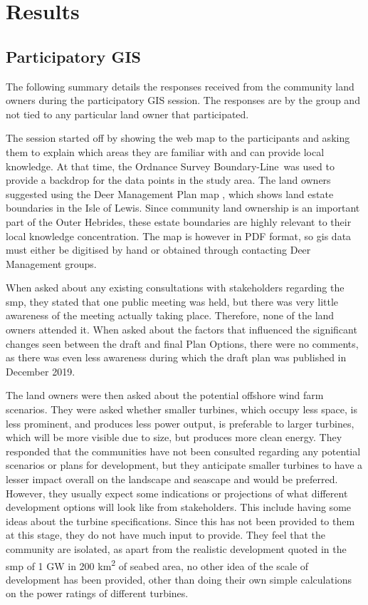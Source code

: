 \chapter{Results}

\section{Participatory GIS}

The following summary details the responses received from the community land owners during the participatory GIS session. The responses are by the group and not tied to any particular land owner that participated.

The session started off by showing the web map to the participants and asking them to explain which areas they are familiar with and can provide local knowledge. At that time, the Ordnance Survey Boundary-Line\texttrademark\ was used to provide a backdrop for the data points in the study area. The land owners suggested using the Deer Management Plan map \autocite{dmg-map}, which shows land estate boundaries in the Isle of Lewis. Since community land ownership is an important part of the Outer Hebrides, these estate boundaries are highly relevant to their local knowledge concentration. The map is however in PDF format, so \gls{gis} data must either be digitised by hand or obtained through contacting Deer Management groups.

When asked about any existing consultations with stakeholders regarding the \gls{smp}, they stated that one public meeting was held, but there was very little awareness of the meeting actually taking place. Therefore, none of the land owners attended it. When asked about the factors that influenced the significant changes seen between the draft and final Plan Options, there were no comments, as there was even less awareness during which the draft plan was published in December 2019.

The land owners were then asked about the potential offshore wind farm scenarios. They were asked whether smaller turbines, which occupy less space, is less prominent, and produces less power output, is preferable to larger turbines, which will be more visible due to size, but produces more clean energy. They responded that the communities have not been consulted regarding any potential scenarios or plans for development, but they anticipate smaller turbines to have a lesser impact overall on the landscape and seascape and would be preferred. However, they usually expect some indications or projections of what different development options will look like from stakeholders. This include having some ideas about the turbine specifications. Since this has not been provided to them at this stage, they do not have much input to provide. They feel that the community are isolated, as apart from the realistic development quoted in the \gls{smp} of 1 GW in 200 km\textsuperscript{2} of seabed area, no other idea of the scale of development has been provided, other than doing their own simple calculations on the power ratings of different turbines.


